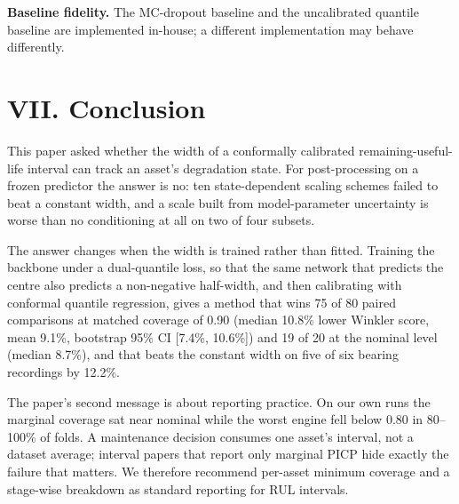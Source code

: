 ﻿\documentclass[journal]{IEEEtran}
\begin{document}
\textbf{Baseline fidelity.} The MC-dropout baseline and the uncalibrated quantile baseline are implemented in-house; a different implementation may behave differently.

\section{VII. Conclusion}\label{vii.-conclusion}

This paper asked whether the width of a conformally calibrated remaining-useful-life interval can track an asset's degradation state. For post-processing on a frozen predictor the answer is no: ten state-dependent scaling schemes failed to beat a constant width, and a scale built from model-parameter uncertainty is worse than no conditioning at all on two of four subsets.

The answer changes when the width is trained rather than fitted. Training the backbone under a dual-quantile loss, so that the same network that predicts the centre also predicts a non-negative half-width, and then calibrating with conformal quantile regression, gives a method that wins 75 of 80 paired comparisons at matched coverage of 0.90 (median 10.8\% lower Winkler score, mean 9.1\%, bootstrap 95\% CI {[}7.4\%, 10.6\%{]}) and 19 of 20 at the nominal level (median 8.7\%), and that beats the constant width on five of six bearing recordings by 12.2\%.

The paper's second message is about reporting practice. On our own runs the marginal coverage sat near nominal while the worst engine fell below 0.80 in 80--100\% of folds. A maintenance decision consumes one asset's interval, not a dataset average; interval papers that report only marginal PICP hide exactly the failure that matters. We therefore recommend per-asset minimum coverage and a stage-wise breakdown as standard reporting for RUL intervals.


\end{document}
